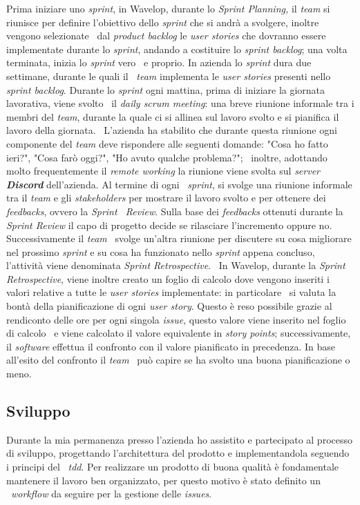 Prima iniziare uno \emph{sprint}, in Wavelop, durante lo \emph{Sprint Planning,} il \emph{team} si riunisce per definire l'obiettivo dello \emph{sprint} che si andrà a svolgere, inoltre vengono selezionate \
dal \emph{product backlog} le \emph{user stories} che dovranno essere implementate durante lo \emph{sprint}, andando a costituire lo \emph{sprint backlog}; una volta terminata, inizia lo \emph{sprint} vero \
e proprio. In azienda lo \emph{sprint} dura due settimane, durante le quali il \
\emph{team} implementa le \emph{user stories} presenti nello \emph{sprint backlog}. Durante lo \emph{sprint} ogni mattina, prima di iniziare la giornata lavorativa, viene svolto \
il \emph{daily scrum meeting}: una breve riunione informale tra i membri del \emph{team}, durante la quale ci si allinea sul lavoro svolto e si pianifica il lavoro della giornata. \
L'azienda ha stabilito che durante questa riunione ogni componente del \emph{team} deve rispondere alle seguenti domande: "Cosa ho fatto ieri?", "Cosa farò oggi?", "Ho avuto qualche problema?"; \
inoltre, adottando molto frequentemente il \emph{remote working} la riunione viene svolta sul \emph{server \textbf{Discord}} dell'azienda. Al termine di ogni \
\emph{sprint}, si svolge una riunione informale tra il \emph{team} e gli \emph{\glspl{stakeholder}} per mostrare il lavoro svolto e per ottenere dei \emph{feedbacks}, ovvero la \emph{Sprint \
Review}. Sulla base dei \emph{feedbacks} ottenuti durante la \emph{Sprint Review} il capo di progetto decide se rilasciare l'incremento oppure no. Successivamente il \emph{team} \
svolge un'altra riunione per discutere su cosa migliorare nel prossimo \emph{sprint} e su cosa ha funzionato nello \emph{sprint} appena concluso, l'attività viene denominata \emph{Sprint Retrospective}. \
In Wavelop, durante la \emph{Sprint Retrospective}, viene inoltre creato un foglio di calcolo dove vengono inseriti i valori relative a tutte le \emph{user stories} implementate: in particolare \
si valuta la bontà della pianificazione di ogni \emph{user story}. Questo è reso possibile grazie al rendiconto delle ore per ogni singola \emph{issue}, questo valore viene inserito nel foglio di calcolo \
e viene calcolato il valore equivalente in \emph{story points}; successivamente, il \emph{software} effettua il confronto con il valore pianificato in precedenza. In base all'esito del confronto il \emph{team} \
può capire se ha svolto una buona pianificazione o meno.

\subsection{Sviluppo}
Durante la mia permanenza presso l'azienda ho assistito e partecipato al processo di sviluppo, progettando l'architettura del prodotto e implementandola seguendo i principi del \
\emph{\acrfull{tdd}}. Per realizzare un prodotto di buona qualità è fondamentale mantenere il lavoro ben organizzato, per questo motivo è stato definito un \
\emph{workflow} da seguire per la gestione delle \emph{issues}. \\

